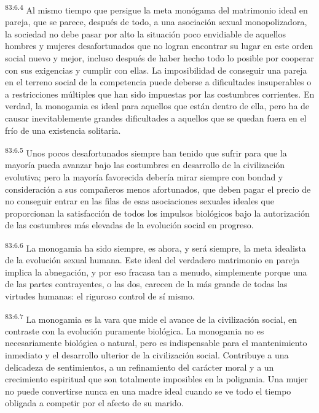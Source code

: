 \documentclass[twoside, 11pt]{book}
\begin{document}
\par
\textsuperscript{83:6.4} Al mismo tiempo que persigue la meta monógama del matrimonio ideal en pareja, que se parece, después de todo, a una asociación sexual monopolizadora, la sociedad no debe pasar por alto la situación poco envidiable de aquellos hombres y mujeres desafortunados que no logran encontrar su lugar en este orden social nuevo y mejor, incluso después de haber hecho todo lo posible por cooperar con sus exigencias y cumplir con ellas. La imposibilidad de conseguir una pareja en el terreno social de la competencia puede deberse a dificultades insuperables o a restricciones múltiples que han sido impuestas por las costumbres corrientes. En verdad, la monogamia es ideal para aquellos que están dentro de ella, pero ha de causar inevitablemente grandes dificultades a aquellos que se quedan fuera en el frío de una existencia solitaria.

\par
\textsuperscript{83:6.5} Unos pocos desafortunados siempre han tenido que sufrir para que la mayoría pueda avanzar bajo las costumbres en desarrollo de la civilización evolutiva; pero la mayoría favorecida debería mirar siempre con bondad y consideración a sus compañeros menos afortunados, que deben pagar el precio de no conseguir entrar en las filas de esas asociaciones sexuales ideales que proporcionan la satisfacción de todos los impulsos biológicos bajo la autorización de las costumbres más elevadas de la evolución social en progreso.

\par
\textsuperscript{83:6.6} La monogamia ha sido siempre, es ahora, y será siempre, la meta idealista de la evolución sexual humana. Este ideal del verdadero matrimonio en pareja implica la abnegación, y por eso fracasa tan a menudo, simplemente porque una de las partes contrayentes, o las dos, carecen de la más grande de todas las virtudes humanas: el riguroso control de sí mismo.

\par
\textsuperscript{83:6.7} La monogamia es la vara que mide el avance de la civilización social, en contraste con la evolución puramente biológica. La monogamia no es necesariamente biológica o natural, pero es indispensable para el mantenimiento inmediato y el desarrollo ulterior de la civilización social. Contribuye a una delicadeza de sentimientos, a un refinamiento del carácter moral y a un crecimiento espiritual que son totalmente imposibles en la poligamia. Una mujer no puede convertirse nunca en una madre ideal cuando se ve todo el tiempo obligada a competir por el afecto de su marido.
\end{document}
